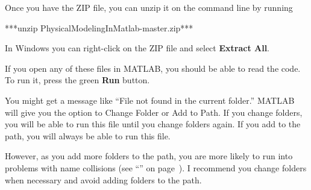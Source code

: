 Once you have the ZIP file, you can unzip it on the command line by running

\begin{code}
***unzip PhysicalModelingInMatlab-master.zip***
\end{code}

In Windows you can right-click on the ZIP file and select \textbf{Extract All}.

If you open any of these files in MATLAB, you should be able to read the code.  To run it, press the green \textbf{Run} button.

You might get a message like ``File not found in the current folder.''
MATLAB will give you the option to Change Folder or Add to Path.  If you change folders, you will be able to run this file until you change folders again.  If you add to the path, you will always be able to run this file.

However, as you add more folders to the path, you are more likely to run into problems with name collisions (see ``'' on page~\pageref{collision}).
I recommend you change folders when necessary and avoid adding folders to the path.


\newpage


\newpage
